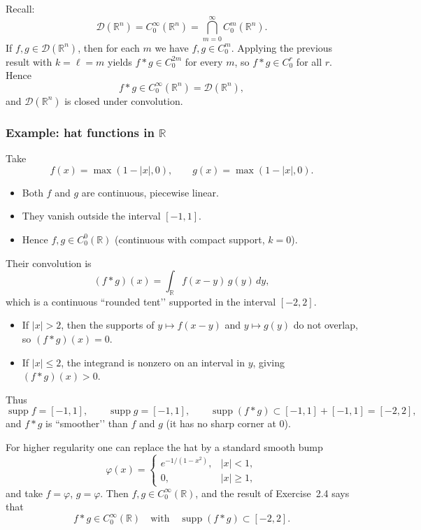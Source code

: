 \documentclass[12pt,a4paper]{article}
\theoremstyle{plain}
\theoremstyle{definition}
\theoremstyle{remark}
\theoremstyle{remark}
\begin{document}
Recall:
\[
\mathcal{D}(\mathbb{R}^n)=C_0^\infty(\mathbb{R}^n)
=\bigcap_{m=0}^\infty C_0^m(\mathbb{R}^n).
\]
If $f,g\in\mathcal{D}(\mathbb{R}^n)$, then for each $m$ we have  
$f,g\in C_0^m$. Applying the previous result with $k=\ell=m$ yields
$f*g\in C_0^{2m}$ for every $m$, so $f*g\in C_0^r$ for all $r$.  
Hence
\[
f*g\in C_0^\infty(\mathbb{R}^n)=\mathcal{D}(\mathbb{R}^n),
\]
and $\mathcal{D}(\mathbb{R}^n)$ is closed under convolution.

\subsubsection*{Example: hat functions in $\mathbb{R}$}

Take
\[
f(x) = \max(1 - |x|,0), \qquad
g(x) = \max(1 - |x|,0).
\]

\begin{itemize}
	\item Both $f$ and $g$ are continuous, piecewise linear.
	\item They vanish outside the interval $[-1,1]$.
	\item Hence $f,g \in C_0^0(\mathbb{R})$ (continuous with compact support, $k=0$).
\end{itemize}

Their convolution is
\[
(f*g)(x) = \int_{\mathbb{R}} f(x-y)\,g(y)\,dy,
\]
which is a continuous “rounded tent’’ supported in the interval $[-2,2]$.

\begin{itemize}
	\item If $|x|>2$, then the supports of $y\mapsto f(x-y)$ and $y\mapsto g(y)$
	do not overlap, so $(f*g)(x)=0$.
	\item If $|x|\le 2$, the integrand is nonzero on an interval in $y$, giving
	$(f*g)(x)>0$.
\end{itemize}

Thus
\[
\operatorname{supp} f = [-1,1], \qquad
\operatorname{supp} g = [-1,1], \qquad
\operatorname{supp}(f*g) \subset [-1,1]+[-1,1]=[-2,2],
\]
and $f*g$ is “smoother’’ than $f$ and $g$ (it has no sharp corner at $0$).

\bigskip

For higher regularity one can replace the hat by a standard smooth bump
\[
\varphi(x) =
\begin{cases}
	e^{-1/(1-x^2)}, & |x|<1,\\[1ex]
	0,              & |x|\ge 1,
\end{cases}
\]
and take $f=\varphi$, $g=\varphi$. Then $f,g\in C_0^\infty(\mathbb{R})$,
and the result of Exercise~2.4 says that
\[
f*g \in C_0^\infty(\mathbb{R})
\quad\text{with}\quad
\operatorname{supp}(f*g)\subset [-2,2].
\]
\end{document}
